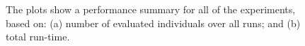 %
%

\begin{figure}[t]
    \centering
    \caption{The plots show a performance summary for all of the experiments, based on:
    (a) number of evaluated individuals over all runs; and (b) total run-time.}

    \label{fig:effort}
\end{figure}

